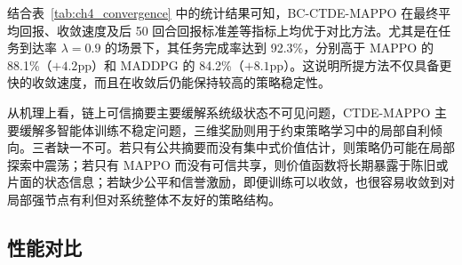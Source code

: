 \begin{table}[htbp]
    \centering
    \footnotesize
    \caption{不同训练算法的收敛性统计对比}
    \label{tab:ch4_convergence}
    \setlength{\tabcolsep}{2.0mm}
    \renewcommand{\arraystretch}{1.15}
\end{table}

结合表~\ref{tab:ch4_convergence} 中的统计结果可知，BC-CTDE-MAPPO 在最终平均回报、收敛速度及后 50 回合回报标准差等指标上均优于对比方法。尤其是在任务到达率 $\lambda=0.9$ 的场景下，其任务完成率达到 92.3\%，分别高于 MAPPO 的 88.1\%（$+4.2$pp）和 MADDPG 的 84.2\%（$+8.1$pp）。这说明所提方法不仅具备更快的收敛速度，而且在收敛后仍能保持较高的策略稳定性。

从机理上看，链上可信摘要主要缓解系统级状态不可见问题，CTDE-MAPPO 主要缓解多智能体训练不稳定问题，三维奖励则用于约束策略学习中的局部自利倾向。三者缺一不可。若只有公共摘要而没有集中式价值估计，则策略仍可能在局部探索中震荡；若只有 MAPPO 而没有可信共享，则价值函数将长期暴露于陈旧或片面的状态信息；若缺少公平和信誉激励，即便训练可以收敛，也很容易收敛到对局部强节点有利但对系统整体不友好的策略结构。

\subsection{性能对比}

